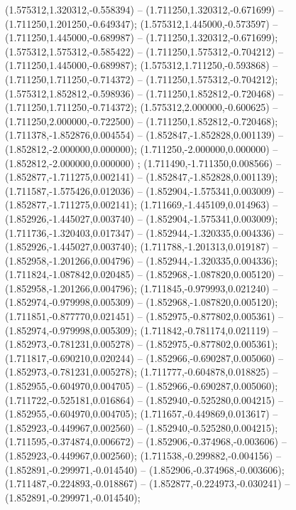  (1.575312,1.320312,-0.558394) -- (1.711250,1.320312,-0.671699) -- (1.711250,1.201250,-0.649347);
 (1.575312,1.445000,-0.573597) -- (1.711250,1.445000,-0.689987) -- (1.711250,1.320312,-0.671699);
 (1.575312,1.575312,-0.585422) -- (1.711250,1.575312,-0.704212) -- (1.711250,1.445000,-0.689987);
 (1.575312,1.711250,-0.593868) -- (1.711250,1.711250,-0.714372) -- (1.711250,1.575312,-0.704212);
 (1.575312,1.852812,-0.598936) -- (1.711250,1.852812,-0.720468) -- (1.711250,1.711250,-0.714372);
 (1.575312,2.000000,-0.600625) -- (1.711250,2.000000,-0.722500) -- (1.711250,1.852812,-0.720468);
 (1.711378,-1.852876,0.004554) -- (1.852847,-1.852828,0.001139) -- (1.852812,-2.000000,0.000000);
 (1.711250,-2.000000,0.000000) -- (1.852812,-2.000000,0.000000) ;
 (1.711490,-1.711350,0.008566) -- (1.852877,-1.711275,0.002141) -- (1.852847,-1.852828,0.001139);
 (1.711587,-1.575426,0.012036) -- (1.852904,-1.575341,0.003009) -- (1.852877,-1.711275,0.002141);
 (1.711669,-1.445109,0.014963) -- (1.852926,-1.445027,0.003740) -- (1.852904,-1.575341,0.003009);
 (1.711736,-1.320403,0.017347) -- (1.852944,-1.320335,0.004336) -- (1.852926,-1.445027,0.003740);
 (1.711788,-1.201313,0.019187) -- (1.852958,-1.201266,0.004796) -- (1.852944,-1.320335,0.004336);
 (1.711824,-1.087842,0.020485) -- (1.852968,-1.087820,0.005120) -- (1.852958,-1.201266,0.004796);
 (1.711845,-0.979993,0.021240) -- (1.852974,-0.979998,0.005309) -- (1.852968,-1.087820,0.005120);
 (1.711851,-0.877770,0.021451) -- (1.852975,-0.877802,0.005361) -- (1.852974,-0.979998,0.005309);
 (1.711842,-0.781174,0.021119) -- (1.852973,-0.781231,0.005278) -- (1.852975,-0.877802,0.005361);
 (1.711817,-0.690210,0.020244) -- (1.852966,-0.690287,0.005060) -- (1.852973,-0.781231,0.005278);
 (1.711777,-0.604878,0.018825) -- (1.852955,-0.604970,0.004705) -- (1.852966,-0.690287,0.005060);
 (1.711722,-0.525181,0.016864) -- (1.852940,-0.525280,0.004215) -- (1.852955,-0.604970,0.004705);
 (1.711657,-0.449869,0.013617) -- (1.852923,-0.449967,0.002560) -- (1.852940,-0.525280,0.004215);
 (1.711595,-0.374874,0.006672) -- (1.852906,-0.374968,-0.003606) -- (1.852923,-0.449967,0.002560);
 (1.711538,-0.299882,-0.004156) -- (1.852891,-0.299971,-0.014540) -- (1.852906,-0.374968,-0.003606);
 (1.711487,-0.224893,-0.018867) -- (1.852877,-0.224973,-0.030241) -- (1.852891,-0.299971,-0.014540);
